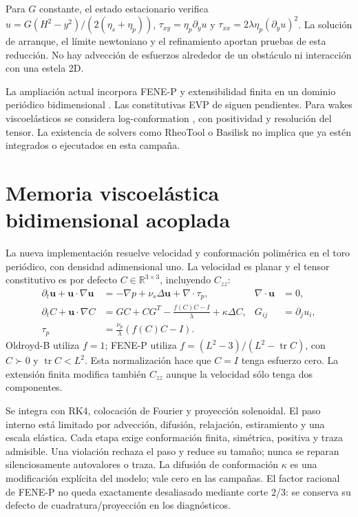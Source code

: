 \documentclass[11pt,oneside,openany]{book}
\newcommand{\R}{\mathbb{R}}
\DeclareMathOperator{\tr}{tr}
\begin{document}
Para $G$ constante, el estado estacionario verifica
$u=G(H^2-y^2)/(2(\eta_s+\eta_p))$,
$\tau_{xy}=\eta_p\partial_yu$ y
$\tau_{xx}=2\lambda\eta_p(\partial_yu)^2$.
La solución de arranque, el límite newtoniano y el refinamiento aportan
pruebas de esta reducción. No hay advección de esfuerzos alrededor de un
obstáculo ni interacción con una estela 2D.

La ampliación actual incorpora FENE-P y extensibilidad finita en un dominio
periódico bidimensional \citep{bird1980fenep}. Las constitutivas EVP de
\citet{saramito2007evp,saramito2009hb} siguen pendientes. Para wakes viscoelásticos se
considera log-conformation \citep{fattal2004log,fattal2005time}, con
positividad y resolución del tensor. La existencia de solvers como
RheoTool \citep{pimenta2017rheotool,rheotoolCode} o Basilisk
\citep{basiliskLogConformation} no implica que ya estén integrados o
ejecutados en esta campaña.

\section{Memoria viscoelástica bidimensional acoplada}
La nueva implementación resuelve velocidad y conformación polimérica en el
toro periódico, con densidad adimensional uno. La velocidad es planar y el
tensor constitutivo es por defecto $C\in\R^{3\times3}$, incluyendo $C_{zz}$:
\begin{align}
 \partial_t\boldsymbol u+\boldsymbol u\cdot\nabla\boldsymbol u
  &=-\nabla p+\nu_s\Delta\boldsymbol u+\nabla\cdot\tau_p,
  &\nabla\cdot\boldsymbol u&=0,\\
 \partial_tC+\boldsymbol u\cdot\nabla C
  &=GC+CG^T-\frac{f(C)C-I}{\lambda}+\kappa\Delta C,
  &G_{ij}&=\partial_j u_i,\\
 \tau_p&=\frac{\nu_p}{\lambda}(f(C)C-I).
\end{align}
Oldroyd-B utiliza $f=1$; FENE-P utiliza
$f=(L^2-3)/(L^2-\tr C)$, con $C\succ0$ y $\tr C<L^2$.
Esta normalización hace que $C=I$ tenga esfuerzo cero. La extensión finita
modifica también $C_{zz}$ aunque la velocidad sólo tenga dos componentes.

Se integra con RK4, colocación de Fourier y proyección solenoidal. El paso
interno está limitado por advección, difusión, relajación, estiramiento y una
escala elástica. Cada etapa exige conformación finita, simétrica, positiva y
traza admisible. Una violación rechaza el paso y reduce su tamaño; nunca se
reparan silenciosamente autovalores o traza. La difusión de conformación
$\kappa$ es una modificación explícita del modelo; vale cero en las campañas.
El factor racional de FENE-P no queda exactamente desaliasado mediante corte
2/3: se conserva su defecto de cuadratura/proyección en los diagnósticos.
\end{document}
